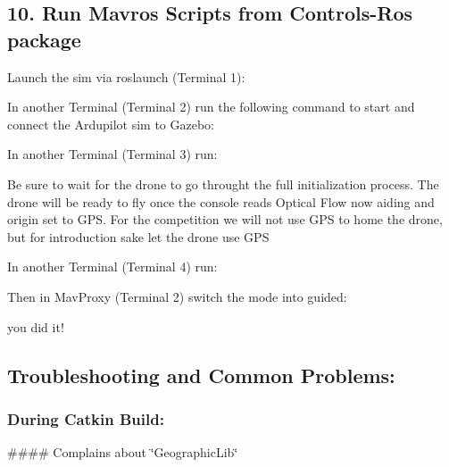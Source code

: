 \subsection*{10. Run Mavros Scripts from Controls-\/\+Ros package}

Launch the sim via roslaunch (Terminal 1)\+: 
\begin{DoxyCode}{0}
\end{DoxyCode}
 In another Terminal (Terminal 2) run the following command to start and connect the Ardupilot sim to Gazebo\+: 
\begin{DoxyCode}{0}
\end{DoxyCode}
 In another Terminal (Terminal 3) run\+: 
\begin{DoxyCode}{0}
\end{DoxyCode}
 Be sure to wait for the drone to go throught the full initialization process. The drone will be ready to fly once the console reads Optical Flow now aiding and origin set to G\+PS. For the competition we will not use G\+PS to home the drone, but for introduction sake let the drone use G\+PS

In another Terminal (Terminal 4) run\+: 
\begin{DoxyCode}{0}
\end{DoxyCode}


Then in Mav\+Proxy (Terminal 2) switch the mode into {\ttfamily guided}\+: 
\begin{DoxyCode}{0}
\end{DoxyCode}


you did it! 🎉

\DoxyHorRuler


\subsection*{Troubleshooting and Common Problems\+:}

\subsubsection*{During Catkin Build\+:}

\#\#\#\# Complains about \char`\"{}\+Geographic\+Lib\char`\"{} 
\begin{DoxyCode}{0}
\end{DoxyCode}


